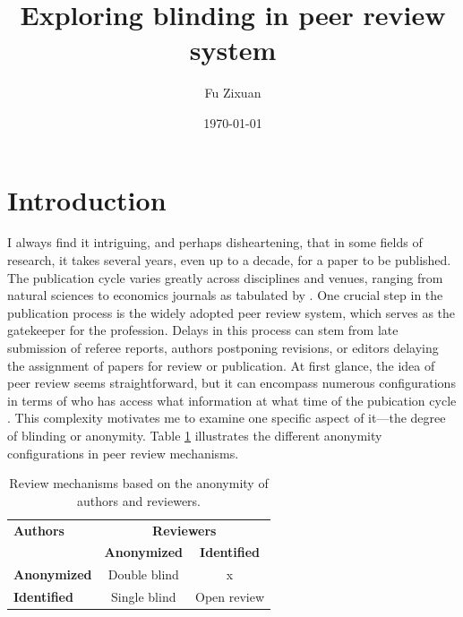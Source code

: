 \documentclass[12pt]{article}
\title{Exploring blinding in peer review system}
\author{Fu Zixuan}
\date{\today}
\begin{document}
\maketitle




\section{Introduction}
I always find it intriguing, and perhaps disheartening, that in some fields of
research, it takes several years, even up to a decade, for a paper to be
published. The publication cycle varies greatly across disciplines and venues,
ranging from natural sciences to economics journals as tabulated by
\citet{hadavand2024publishing}. One crucial step in the publication process is
the widely adopted peer review system, which serves as the gatekeeper for the
profession. Delays in this process can stem from late submission of referee
reports, authors postponing revisions, or editors delaying the assignment of
papers for review or publication. At first glance, the idea of peer review
seems straightforward, but it can encompass numerous configurations in terms of
who has access what information at what time of the pubication cycle
\citep{soergel2013open}. This complexity motivates me to examine one specific
aspect of it—the degree of blinding or anonymity. Table
\ref{tab:review_mechanism} illustrates the different anonymity configurations
in peer review mechanisms.

\begin{table}[h!]
    \centering
    \begin{tabular}{lcc}
        \toprule
        \textbf{Authors}    & \multicolumn{2}{c}{\textbf{Reviewers}}                       \\ \cmidrule(lr){2-3}
                            & \textbf{Anonymized}                    & \textbf{Identified} \\ \midrule
        \textbf{Anonymized} & Double blind                           & x                   \\
        \textbf{Identified} & Single blind                           & Open review         \\ \bottomrule
    \end{tabular}
    \caption{Review mechanisms based on the anonymity of authors and reviewers.}
    \label{tab:review_mechanism}
\end{table}
\end{document}
